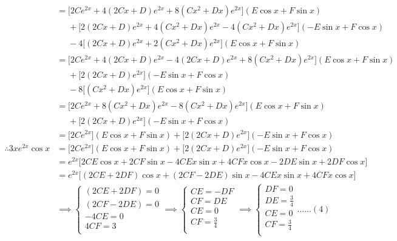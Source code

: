 \documentclass[a4paper]{article}
\begin{document}
\begin{enumerate}
\begin{align*}
		& = \Big[2Ce^{2x} + 4(2Cx+D)e^{2x} + 8(Cx^2+Dx)e^{2x} \Big](E\cos{x} + F\sin{x})\\
		& \phantom{{}={}} + \Big[2(2Cx+D)e^{2x} + 4(Cx^2+Dx)e^{2x} - 4(Cx^2 + Dx)e^{2x} \Big](-E\sin{x} + F\cos{x})\\
		& \phantom{{}={}} - 4\Big[(2Cx + D)e^{2x} + 2(Cx^2 + Dx)e^{2x} \Big](E\cos{x} + F\sin{x})\\ 
		& = \Big[2Ce^{2x} + 4(2Cx+D)e^{2x} - 4(2Cx + D)e^{2x} + 8(Cx^2+Dx)e^{2x} \Big](E\cos{x} + F\sin{x})\\
		& \phantom{{}={}} + \Big[2(2Cx+D)e^{2x}\Big](-E\sin{x} + F\cos{x})\\
		& \phantom{{}={}} - 8\Big[(Cx^2 + Dx)e^{2x} \Big](E\cos{x} + F\sin{x})\\
		& = \Big[2Ce^{2x} + 8(Cx^2+Dx)e^{2x} - 8(Cx^2 + Dx)e^{2x} \Big](E\cos{x} + F\sin{x})\\
		& \phantom{{}={}} + \Big[2(2Cx+D)e^{2x}\Big](-E\sin{x} + F\cos{x})\\
		& = \Big[2Ce^{2x} \Big](E\cos{x} + F\sin{x}) + \Big[2(2Cx+D)e^{2x}\Big](-E\sin{x} + F\cos{x})\\
		\therefore 3xe^{2x}\cos{x} & = \Big[2Ce^{2x} \Big](E\cos{x} + F\sin{x}) + \Big[2(2Cx+D)e^{2x}\Big](-E\sin{x} + F\cos{x})\\
		& = e^{2x}\Big[2CE\cos{x} + 2CF\sin{x} - 4CEx\sin{x} + 4CFx\cos{x} - 2DE\sin{x} + 2DF\cos{x} \Big]\\
		& = e^{2x}\Big[(2CE + 2DF)\cos{x} + (2CF - 2DE)\sin{x} - 4CEx\sin{x} + 4CFx\cos{x} \Big]\\
		& \implies
		\begin{cases}
			(2CE + 2DF) = 0\\
			(2CF - 2DE) = 0\\
			- 4CE = 0\\
			4CF = 3\\
		\end{cases}
		\implies
		\begin{cases}
			CE = -DF\\
			CF = DE\\
			CE = 0\\
			CF = \frac{3}{4}\\
		\end{cases}
		\implies
		\begin{cases}
			DF = 0\\
			DE = \frac{3}{4}\\
			CE = 0\\
			CF = \frac{3}{4}\\
		\end{cases} \dots\dots (4)\\

\end{align*}
\end{enumerate}
\end{document}
